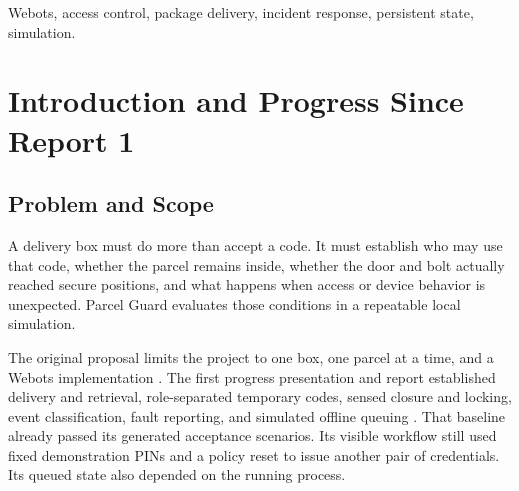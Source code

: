 \documentclass[conference,letterpaper]{IEEEtran}
\begin{document}
\begin{abstract}
Parcel Guard models a delivery security box in Webots. This second progress report extends the earlier fixed-code workflow with password-authenticated owner management, revocable one-use access codes, and persistent incident lockdown. An owner can authorize delivery or collection, revoke unused credentials, and run another delivery without resetting policy state. Unexplained activity revokes outstanding codes and ends owner sessions. Recovery requires a new owner sign-in and measured door closure and bolt locking. Local checkpoints retain pending events, credential state, cooldown and incidents across controller restarts. The current evaluation passes \SecurityTests{} security-policy tests, \DashboardChecks{} dashboard checks, and \SecurityGroups{} Webots security groups containing \SecurityAssertions{} assertions. Separate legacy-fixture benchmarks retain 50/50 package-presence decisions and macro F1 of 1.00 on generated scenarios. The report distinguishes these two evidence sets, describes implementation and failure behavior, and reports the follow-up test in which one tamper alert survived a lost acknowledgment and both controller restarts.
\end{abstract}
\begin{IEEEkeywords}Webots, access control, package delivery, incident response, persistent state, simulation.\end{IEEEkeywords}

\section{Introduction and Progress Since Report 1}
\subsection{Problem and Scope}
A delivery box must do more than accept a code. It must establish who may use that code, whether the parcel remains inside, whether the door and bolt actually reached secure positions, and what happens when access or device behavior is unexpected. Parcel Guard evaluates those conditions in a repeatable local simulation.

The original proposal limits the project to one box, one parcel at a time, and a Webots implementation \cite{proposal}. The first progress presentation and report established delivery and retrieval, role-separated temporary codes, sensed closure and locking, event classification, fault reporting, and simulated offline queuing \cite{progressone}. That baseline already passed its generated acceptance scenarios. Its visible workflow still used fixed demonstration PINs and a policy reset to issue another pair of credentials. Its queued state also depended on the running process.
\end{document}
